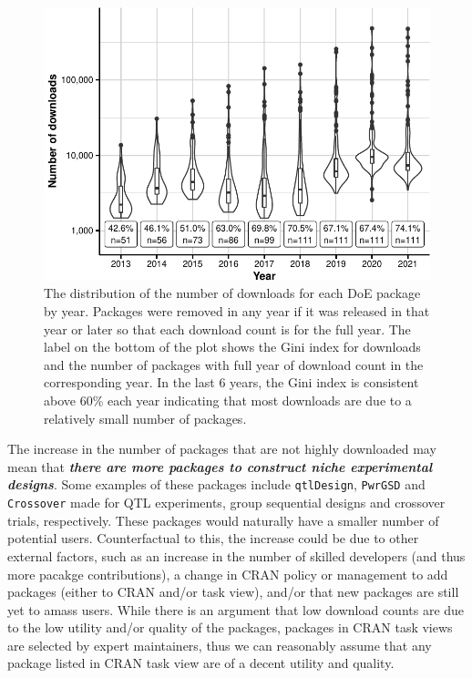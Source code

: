 \documentclass{article}
\begin{document}
\begin{figure}[htbp]

{\centering \includegraphics{figures/download-share-1} 

}

\caption{The distribution of the number of downloads for each DoE package by year. Packages were removed in any year if it was released in that year or later so that each download count is for the full year. The label on the bottom of the plot shows the Gini index for downloads and the number of packages with full year of download count in the corresponding year. In the last 6 years, the Gini index is consistent above 60\% each year indicating that most downloads are due to a relatively small number of packages. }\label{fig:download-share}
\end{figure}

The increase in the number of packages that are not highly downloaded
may mean that \textbf{\emph{there are more packages to construct niche
experimental designs}}. Some examples of these packages include
\texttt{qtlDesign}, \texttt{PwrGSD} and \texttt{Crossover} made for QTL
experiments, group sequential designs and crossover trials,
respectively. These packages would naturally have a smaller number of
potential users. Counterfactual to this, the increase could be due to
other external factors, such as an increase in the number of skilled
developers (and thus more pacakge contributions), a change in CRAN
policy or management to add packages (either to CRAN and/or task view),
and/or that new packages are still yet to amass users. While there is an
argument that low download counts are due to the low utility and/or
quality of the packages, packages in CRAN task views are selected by
expert maintainers, thus we can reasonably assume that any package
listed in CRAN task view are of a decent utility and quality.
\end{document}
